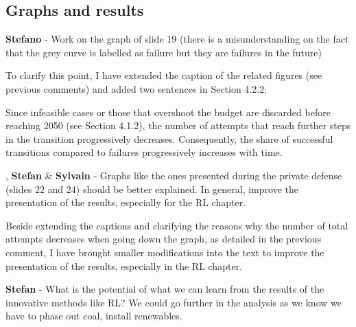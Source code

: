 \documentclass[12pt,a4paper]{article}
\begin{document}
\subsection{Graphs and results}

\begin{mdframed}[style=comment] %
{\color{orange} \textbf{Stefano}} - Work on the graph of slide 19 (there is a misunderstanding on the fact that the grey curve is labelled as failure but they are failures in the future)
\end{mdframed}

\noindent To clarify this point, I have extended the caption of the related figures (see previous comments) and added two sentences in {\color{blue} Section 4.2.2}:

\begin{mdframed}[style=manuscript] %
Since infeasible cases or those that overshoot the  budget are discarded before reaching 2050 (see Section 4.1.2), the number of attempts that reach further steps in the transition progressively decreases. Consequently, the share of successful transitions compared to failures progressively increases with time. 
\end{mdframed}

\begin{mdframed}[style=comment] %
, {\color{teal} \textbf{Stefan}} \& {\color{purple} \textbf{Sylvain}} - Graphs like the ones presented during the private defense (slides 22 and 24) should be better explained. In general, improve the presentation of the results, especially for the RL chapter.
\end{mdframed}

\noindent Beside extending the captions and clarifying the reasons why the number of total attempts decreases when going down the graph, as detailed in the previous comment, I have brought smaller modifications into the text to improve the presentation of the results, especially in the RL chapter.

\begin{mdframed}[style=comment] %
{\color{teal} \textbf{Stefan}} - What is the potential of what we can learn from the results of the innovative methods like RL? We could go further in the analysis as we know we have to phase out coal, install renewables.
\end{mdframed}
\end{document}
